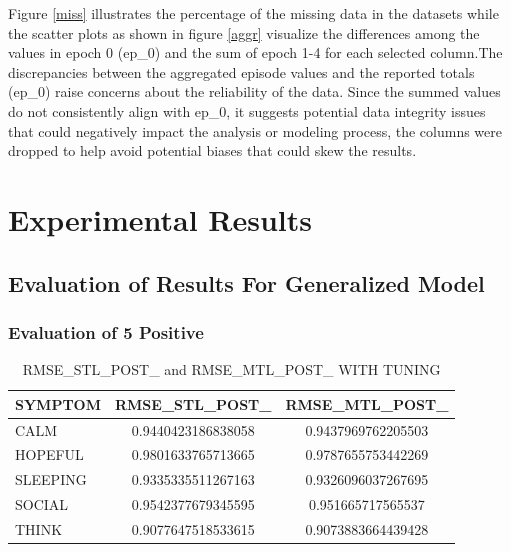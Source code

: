  Figure \ref{miss} illustrates the percentage of the missing data in the datasets while the scatter plots as shown in figure \ref{aggr} visualize the differences among the values in epoch 0 (ep\_0) and the sum of epoch 1-4 for each selected column.The discrepancies between the aggregated episode values and the reported totals (ep\_0) raise concerns about the reliability of the data. Since the summed values do not consistently align with ep\_0, it suggests potential data integrity issues that could negatively impact the analysis or modeling process, the columns were dropped to help avoid potential biases that could skew the results.

\section{Experimental Results}


\subsection{Evaluation of Results For Generalized Model }

\subsubsection{Evaluation of 5 Positive }


\begin{table}[H]
\centering
\caption{RMSE\_STL\_POST\_ and RMSE\_MTL\_POST\_ WITH TUNING}
\label{table:rmse_post_comp_tune}
\begin{tabular}{|l|c|c|}
\hline
\textbf{SYMPTOM} & \textbf{RMSE\_STL\_POST\_} & \textbf{RMSE\_MTL\_POST\_} \\ \hline
CALM & 0.9440423186838058 & 0.9437969762205503 \\ \hline
HOPEFUL & 0.9801633765713665 & 0.9787655753442269 \\ \hline
SLEEPING & 0.9335335511267163 & 0.9326096037267695 \\ \hline
SOCIAL & 0.9542377679345595 & 0.951665717565537 \\ \hline
THINK & 0.9077647518533615 & 0.9073883664439428 \\ \hline
\end{tabular}
\end{table}


